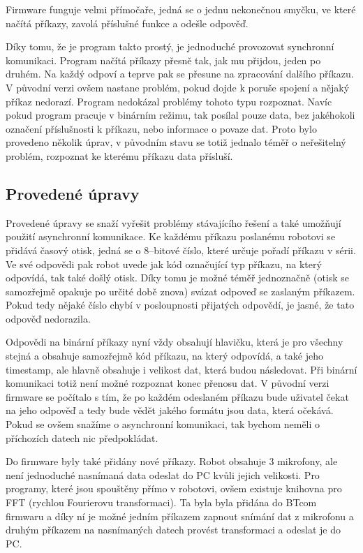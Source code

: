 \documentclass[12pt,notitlepage]{report}
\begin{document}
    Firmware funguje velmi přímočaře, jedná se o jednu nekonečnou smyčku, ve
    které načítá příkazy, zavolá příslušné funkce a odešle odpověď.

    Díky tomu, že je program takto prostý, je jednoduché provozovat synchronní
    komunikaci. Program načítá příkazy přesně tak, jak mu přijdou, jeden po
    druhém. Na každý odpoví a teprve pak se přesune na zpracování dalšího
    příkazu. V původní verzi ovšem nastane problém, pokud dojde k poruše
    spojení a nějaký příkaz nedorazí. Program nedokázal problémy tohoto typu
    rozpoznat. Navíc pokud program pracuje v binárním režimu, tak posílal pouze
    data, bez jakéhokoli označení příslušnosti k příkazu, nebo informace o
    povaze dat. Proto bylo provedeno několik úprav, v původním stavu se totiž
    jednalo téměř o neřešitelný problém, rozpoznat ke kterému příkazu data
    přísluší.

    \subsection{Provedené úpravy}

    Provedené úpravy se snaží vyřešit problémy stávajícího řešení a také
    umožňují použití asynchronní komunikace. Ke každému příkazu poslanému
    robotovi se přidává časový otisk, jedná se o 8--bitové číslo, které určuje
    pořadí příkazu v sérii. Ve své odpovědi pak robot uvede jak kód označující
    typ příkazu, na který odpovídá, tak také došlý otisk. Díky tomu je možné
    téměř jednoznačně (otisk se samozřejmě opakuje po určité době znova) svázat
    odpoveď se zaslaným příkazem. Pokud tedy nějaké číslo chybí v posloupnosti
    přijatých odpovědí, je jasné, že tato odpověď nedorazila.

    Odpovědi na binární příkazy nyní vždy obsahují hlavičku, která je pro
    všechny stejná a obsahuje samozřejmě kód příkazu, na který odpovídá, a také
    jeho timestamp, ale hlavně obsahuje i velikost dat, která budou následovat.
    Při binární komunikaci totiž není možné rozpoznat konec přenosu dat. V
    původní verzi firmware se počítalo s tím, že po každém odeslaném příkazu
    bude uživatel čekat na jeho odpověď a tedy bude vědět jakého formátu jsou
    data, která očekává. Pokud se ovšem snažíme o asynchronní komunikaci, tak
    bychom neměli o příchozích datech nic předpokládat.

    Do firmware byly také přidány nové příkazy. Robot obsahuje 3 mikrofony, ale
    není jednoduché nasnímaná data odeslat do PC kvůli jejich velikosti. Pro
    programy, které jsou spouštěny přímo v robotovi, ovšem existuje knihovna
    pro FFT (rychlou Fourierovu transformaci). Ta byla byla přidána do BTcom
    firmwaru a díky ní je možné jedním příkazem zapnout snímání dat z mikrofonu
    a druhým příkazem na nasnímaných datech provést transformaci a odeslat je
    do PC.
\end{document}
